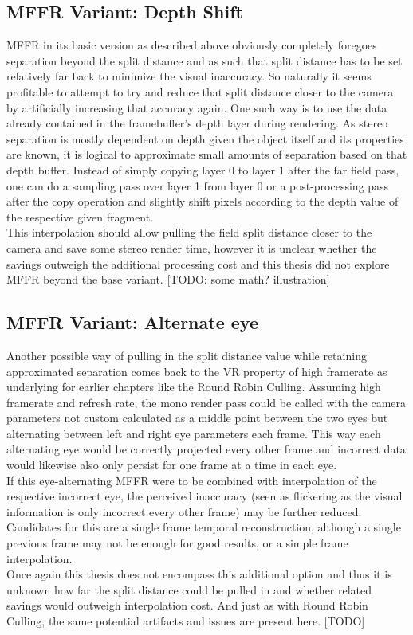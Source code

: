 \subsection{MFFR Variant: Depth Shift}  \label{mffr_depthshift}
MFFR in its basic version as described above obviously completely foregoes separation beyond the split distance and as such that split distance has to be set relatively far back to minimize the visual inaccuracy. So naturally it seems profitable to attempt to try and reduce that split distance closer to the camera by artificially increasing that accuracy again. One such way is to use the data already contained in the framebuffer's depth layer during rendering. 
As stereo separation is mostly dependent on depth given the object itself and its properties are known, it is logical to approximate small amounts of separation based on that depth buffer. 
Instead of simply copying layer 0 to layer 1 after the far field pass, one can do a sampling pass over layer 1 from layer 0 or a post-processing pass after the copy operation and slightly shift pixels according to the depth value of the respective given fragment. \\
This interpolation should allow pulling the field split distance closer to the camera and save some stereo render time, however it is unclear whether the savings outweigh the additional processing cost and this thesis did not explore MFFR beyond the base variant. 
[TODO: some math? illustration]

\subsection{MFFR Variant: Alternate eye}
Another possible way of pulling in the split distance value while retaining approximated separation comes back to the VR property of high framerate as underlying for earlier chapters like the Round Robin Culling. 
Assuming high framerate and refresh rate, the mono render pass could be called with the camera parameters not custom calculated as a middle point between the two eyes but alternating between left and right eye parameters each frame. This way each alternating eye would be correctly projected every other frame and incorrect data would likewise also only persist for one frame at a time in each eye. \\
If this eye-alternating MFFR were to be combined with interpolation of the respective incorrect eye, the perceived inaccuracy (seen as flickering as the visual information is only incorrect every other frame) may be further reduced. Candidates for this are a single frame temporal reconstruction, although a single previous frame may not be enough for good results, or a simple frame interpolation. \\
Once again this thesis does not encompass this additional option and thus it is unknown how far the split distance could be pulled in and whether related savings would outweigh interpolation cost. And just as with Round Robin Culling, the same potential artifacts and issues are present here. [TODO]
